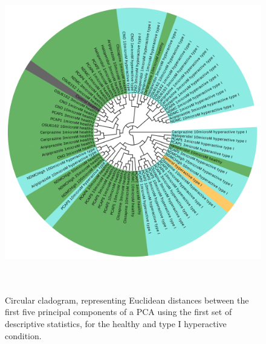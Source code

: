 \documentclass[a4paper,12pt]{article}
\begin{document}
\begin{figure}[h!]
\begin{center}
\includegraphics[width=14cm,height=14cm]{DarkApoHigh_set1_PCA_tree_A.png}
\caption{Circular cladogram, representing Euclidean distances between the first five principal components of a PCA using the first set of descriptive statistics, for the healthy and type I hyperactive condition.}
\end{center}
\end{figure}
\newpage
\end{document}
